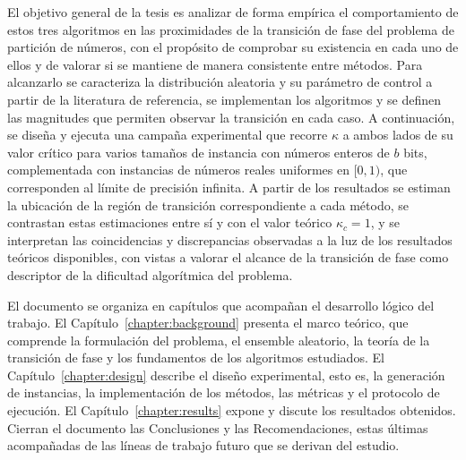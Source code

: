 El objetivo general de la tesis es analizar de forma empírica el comportamiento de estos tres algoritmos en las proximidades de la transición de fase del problema de partición de números, con el propósito de comprobar su existencia en cada uno de ellos y de valorar si se mantiene de manera consistente entre métodos. Para alcanzarlo se caracteriza la distribución aleatoria y su parámetro de control a partir de la literatura de referencia, se implementan los algoritmos y se definen las magnitudes que permiten observar la transición en cada caso. A continuación, se diseña y ejecuta una campaña experimental que recorre $\kappa$ a ambos lados de su valor crítico para varios tamaños de instancia con números enteros de $b$ bits, complementada con instancias de números reales uniformes en $[0,1)$, que corresponden al límite de precisión infinita. A partir de los resultados se estiman la ubicación de la región de transición correspondiente a cada método, se contrastan estas estimaciones entre sí y con el valor teórico $\kappa_c = 1$, y se interpretan las coincidencias y discrepancias observadas a la luz de los resultados teóricos disponibles, con vistas a valorar el alcance de la transición de fase como descriptor de la dificultad algorítmica del problema.

El documento se organiza en capítulos que acompañan el desarrollo lógico del trabajo. El Capítulo~\ref{chapter:background} presenta el marco teórico, que comprende la formulación del problema, el ensemble aleatorio, la teoría de la transición de fase y los fundamentos de los algoritmos estudiados. El Capítulo~\ref{chapter:design} describe el diseño experimental, esto es, la generación de instancias, la implementación de los métodos, las métricas y el protocolo de ejecución. El Capítulo~\ref{chapter:results} expone y discute los resultados obtenidos. Cierran el documento las Conclusiones y las Recomendaciones, estas últimas acompañadas de las líneas de trabajo futuro que se derivan del estudio.
